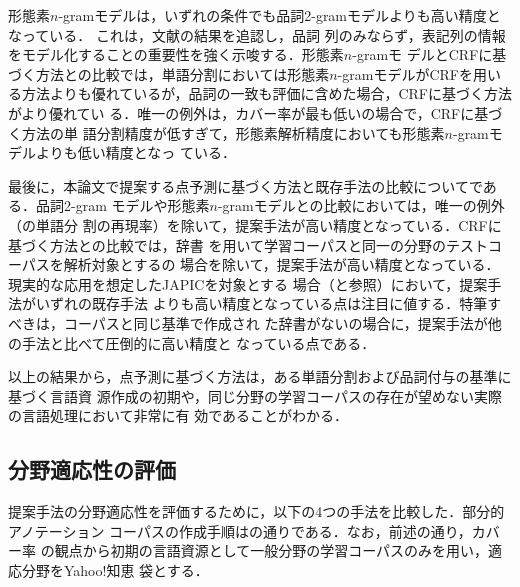 \documentclass[japanese]{jnlp_1.4}
\def\tabref#1{}
\def\subref#1{}
\begin{document}
形態素$n$-gramモデルは，いずれの条件でも品詞2-gramモデルよりも高い精度となっている．
これは，文献\cite{形態素クラスタリングによる形態素解析精度の向上}の結果を追認し，品詞
列のみならず，表記列の情報をモデル化することの重要性を強く示唆する．形態素$n$-gramモ
デルとCRFに基づく方法との比較では，単語分割においては形態素$n$-gramモデルがCRFを用い
る方法よりも優れているが，品詞の一致も評価に含めた場合，CRFに基づく方法がより優れてい
る．唯一の例外は，カバー率が最も低い\tabref{table:L1T3}の場合で，CRFに基づく方法の単
語分割精度が低すぎて，形態素解析精度においても形態素$n$-gramモデルよりも低い精度となっ
ている．

最後に，本論文で提案する点予測に基づく方法と既存手法の比較についてである．品詞2-gram
モデルや形態素$n$-gramモデルとの比較においては，唯一の例外（\tabref{table:L2T1}の単語分
割の再現率）を除いて，提案手法が高い精度となっている．CRFに基づく方法との比較では，辞書
を用いて学習コーパスと同一の分野のテストコーパスを解析対象とする\tabref{table:L2T1}の
場合を除いて，提案手法が高い精度となっている．現実的な応用を想定したJAPICを対象とする
場合（\tabref{table:L1T3}と\tabref{table:L2T3}参照）において，提案手法がいずれの既存手法
よりも高い精度となっている点は注目に値する．特筆すべきは，コーパスと同じ基準で作成され
た辞書がない\tabref{table:L1T3}の場合に，提案手法が他の手法と比べて圧倒的に高い精度と
なっている点である．

以上の結果から，点予測に基づく方法は，ある単語分割および品詞付与の基準に基づく言語資
源作成の初期や，同じ分野の学習コーパスの存在が望めない実際の言語処理において非常に有
効であることがわかる．



\subsection{分野適応性の評価}

提案手法の分野適応性を評価するために，以下の4つの手法を比較した．部分的アノテーション
コーパスの作成手順は\subref{subsection:戦略}の通りである．なお，前述の通り，カバー率
の観点から初期の言語資源として一般分野の学習コーパスのみを用い，適応分野をYahoo!知恵
袋とする．
\end{document}
